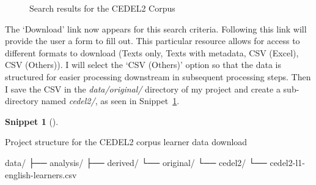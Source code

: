 \documentclass[
  letterpaper,
  krantz1]{latex/krantz-mod}
\newenvironment{Shaded}{\begin{snugshade}}{\end{snugshade}}
\newcommand{\ExtensionTok}[1]{\textcolor[rgb]{0.00,0.00,0.00}{#1}}
\newcommand{\NormalTok}[1]{\textcolor[rgb]{0.00,0.00,0.00}{#1}}
\theoremstyle{definition}
\theoremstyle{definition}
\newtheorem{definition}{Snippet}[chapter]
\theoremstyle{remark}
\begin{document}
\begin{figure}[!htb]


\caption{\label{fig-acquire-cedel2-results}Search results for the CEDEL2
Corpus}

\end{figure}%

The `Download' link now appears for this search criteria. Following this
link will provide the user a form to fill out. This particular resource
allows for access to different formats to download (Texts only, Texts
with metadata, CSV (Excel), CSV (Others)). I will select the `CSV
(Others)' option so that the data is structured for easier processing
downstream in subsequent processing steps. Then I save the CSV in the
\emph{data/original/} directory of my project and create a sub-directory
named \emph{cedel2/}, as seen in
Snippet~\ref{def-acquire-cedel2-learners-download}.

\pagebreak

\begin{definition}[]\protect\hypertarget{def-acquire-cedel2-learners-download}{}\label{def-acquire-cedel2-learners-download}

Project structure for the CEDEL2 corpus learner data download

\begin{Shaded}
\begin{Highlighting}[]
\ExtensionTok{data/}
\ExtensionTok{├──}\NormalTok{ analysis/}
\ExtensionTok{├──}\NormalTok{ derived/}
\ExtensionTok{└──}\NormalTok{ original/}
    \ExtensionTok{└──}\NormalTok{ cedel2/}
    \ExtensionTok{└──}\NormalTok{ cedel2{-}l1{-}english{-}learners.csv}
\end{Highlighting}
\end{Shaded}

\end{definition}
\end{document}

